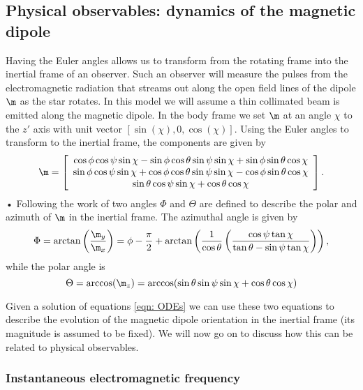 \documentclass[/home/greg/Thesis/main/main.tex]{subfiles}
\begin{document}
\subsection{Physical observables: dynamics of the magnetic dipole} 
Having the Euler angles allows us to transform from the rotating frame into the
inertial frame of an observer. Such an observer will measure the pulses from
the electromagnetic radiation that streams out along the open field lines of
the dipole $\m$ as the star rotates. In this model we will assume a thin
collimated beam is emitted along the magnetic dipole. In the body frame we
set $\m$ at an angle $\chi$ to the $z'$ axis with unit vector $[\sin(\chi), 0,
\cos(\chi)]$.  Using the Euler angles to transform to the inertial frame, the
components are given by
\begin{equation}
\m = 
\left[\begin{array}{c}
\cos\phi\cos\psi\sin\chi - \sin\phi \cos \theta \sin \psi \sin \chi 
+ \sin \phi \sin \theta \cos \chi \\
\sin\phi\cos\psi\sin\chi + \cos\phi \cos \theta \sin \psi \sin \chi 
- \cos \phi \sin \theta \cos \chi \\
\sin\theta \cos\psi \sin\chi + \cos\theta \cos \chi
\end{array}\right].
\label{eqn: m inertial}
\end{equation}•
Following the work of \citet{Jones2001} two angles $\Phi$ and $\Theta$ are
defined to describe the polar and azimuth of $\m$ in the inertial frame.
The azimuthal angle is given by 
\begin{equation}
    \Phi = \arctan\left(\frac{\m_{y}}{\m_{x}}\right) = 
\phi - \frac{\pi}{2} + \arctan\left(\frac{1}{\cos\theta}
                       \left(\frac{\cos\psi \tan \chi}{\tan\theta - 
                       \sin \psi \tan\chi }\right)\right),
\label{eqn: Phi}
\end{equation}
while the polar angle is
\begin{equation}
\Theta = \arccos(\m_{z}) = \arccos(\sin \theta \sin \psi \sin \chi + \cos \theta \cos \chi )
\label{eqn: Theta}
\end{equation}

Given a solution of equations \eqref{eqn: ODEs} we can use these two equations
to describe the evolution of the magnetic dipole orientation in the inertial
frame (its magnitude is assumed to be fixed). We will now go on to discuss how
this can be related to physical observables.

\subsubsection{Instantaneous electromagnetic frequency}
\end{document}
